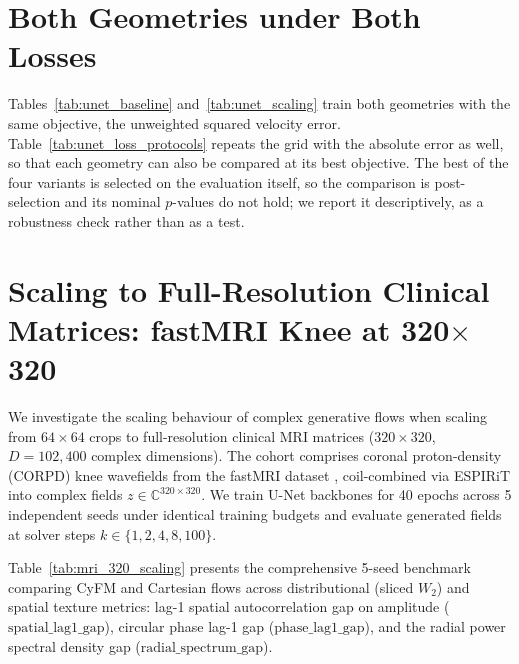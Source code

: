 \section{Both Geometries under Both Losses}
\label{sec:app_losses}
Tables~\ref{tab:unet_baseline} and~\ref{tab:unet_scaling} train both geometries with the same objective, the unweighted squared velocity error. Table~\ref{tab:unet_loss_protocols} repeats the grid with the absolute error as well, so that each geometry can also be compared at its best objective. The best of the four variants is selected on the evaluation itself, so the comparison is post-selection and its nominal $p$-values do not hold; we report it descriptively, as a robustness check rather than as a test.





\section{Scaling to Full-Resolution Clinical Matrices: fastMRI Knee at 320\texorpdfstring{$\times$}{x}320}
\label{sec:app_mri_scaling}

We investigate the scaling behaviour of complex generative flows when scaling from $64\times64$ crops to full-resolution clinical MRI matrices ($320\times320$, $D=102{,}400$ complex dimensions). The cohort comprises coronal proton-density (CORPD) knee wavefields from the fastMRI dataset \citep{zbontar2018fastmri}, coil-combined via ESPIRiT into complex fields $z \in \mathbb{C}^{320\times320}$. We train U-Net backbones for 40 epochs across 5 independent seeds under identical training budgets and evaluate generated fields at solver steps $k \in \{1, 2, 4, 8, 100\}$.

Table~\ref{tab:mri_320_scaling} presents the comprehensive 5-seed benchmark comparing CyFM and Cartesian flows across distributional (sliced $W_2$) and spatial texture metrics: lag-1 spatial autocorrelation gap on amplitude ($\text{spatial\_lag1\_gap}$), circular phase lag-1 gap ($\text{phase\_lag1\_gap}$), and the radial power spectral density gap ($\text{radial\_spectrum\_gap}$).

